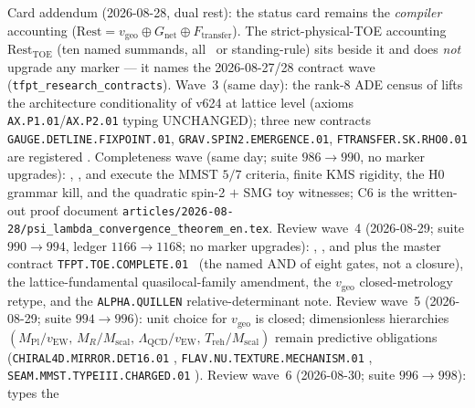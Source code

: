 \markerkey
\noindent Card addendum (2026-08-28, dual rest): the status card remains the \emph{compiler} accounting
($\mathrm{Rest}=v_{\mathrm{geo}}\oplus G_{\mathrm{net}}\oplus F_{\mathrm{transfer}}$).  The strict-physical-TOE
accounting $\mathrm{Rest}_{\mathrm{TOE}}$ (ten named summands, all \mO\ or standing-rule) sits beside it
and does \emph{not} upgrade any marker --- it names the 2026-08-27/28 contract wave
(\texttt{tfpt\_research\_contracts}).  Wave~3 (same day): the rank-8 ADE census of
 lifts the architecture conditionality of v624 at lattice
level (axioms \texttt{AX.P1.01}/\texttt{AX.P2.01} typing UNCHANGED); three new contracts
\texttt{GAUGE.DETLINE.FIXPOINT.01}, \texttt{GRAV.SPIN2.EMERGENCE.01},
\texttt{FTRANSFER.SK.RHO0.01} are registered \mO.
Completeness wave (same day; suite $986\to 990$, no marker upgrades):
,
,
 and
execute the MMST $5/7$ criteria, finite KMS rigidity, the H0 grammar kill, and the
quadratic spin-2 $+$ SMG toy witnesses; C6 is the written-out proof document
\texttt{articles/2026-08-28/\allowbreak psi\_lambda\_\allowbreak convergence\_\allowbreak theorem\_en.tex}.
Review wave~4 (2026-08-29; suite $990\to994$, ledger $1166\to1168$; no marker upgrades):
,
,
 and
plus the master contract \texttt{TFPT.TOE.COMPLETE.01} \mO\ (the named AND of eight
gates, not a closure), the lattice-fundamental quasilocal-family amendment, the
$v_{\mathrm{geo}}$ closed-metrology retype, and the \texttt{ALPHA.QUILLEN} relative-determinant
note.
Review wave~5 (2026-08-29; suite $994\to996$): unit choice for $v_{\mathrm{geo}}$ is closed;
dimensionless hierarchies $(M_{\mathrm{Pl}}/v_{\mathrm{EW}},\,M_R/M_{\mathrm{scal}},\,
\Lambda_{\mathrm{QCD}}/v_{\mathrm{EW}},\,T_{\mathrm{reh}}/M_{\mathrm{scal}})$ remain predictive
obligations (\texttt{CHIRAL4D.MIRROR.DET16.01} \mC, \texttt{FLAV.NU.TEXTURE.MECHANISM.01} \mO,
\texttt{SEAM.MMST.TYPEIII.CHARGED.01} \mO).
Review wave~6 (2026-08-30; suite $996\to998$):
 types the
